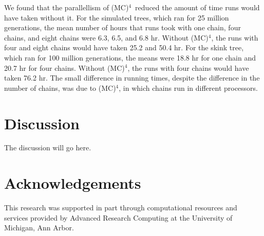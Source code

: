 \documentclass[12pt]{article}
\newcommand{\MCMCMCMC}{(MC)$^{4}$}
\begin{document}
We found that the parallellism of \MCMCMCMC\ 
reduced the amount of time runs would have taken without it.
%
For the simulated trees, which ran for 25 million generations,
the mean number of hours that runs took with
one chain, four chains, and eight chains were
6.3, 6.5, and 6.8 hr.
%
Without \MCMCMCMC, the runs with four and eight chains
would have taken 25.2 and 50.4 hr.
%
For the skink tree, which ran for 100 million generations,
the means were 18.8 hr for one chain
and 20.7 hr for four chains.
%
Without \MCMCMCMC, the runs with four chains would have taken 76.2 hr.
%
The small difference in running times,
despite the difference in the number of chains,
was due to \MCMCMCMC, in which chains run in different processors.


\section*{Discussion}

The discussion will go here.


\section*{Acknowledgements}

This research was supported in part through computational resources
and services provided by Advanced Research Computing
at the University of Michigan, Ann Arbor.



\end{document}
